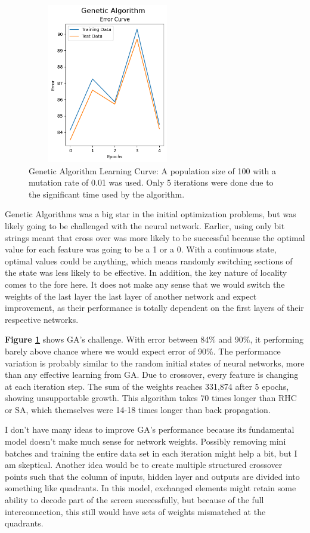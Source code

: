 \documentclass[letterpaper]{article} %
\begin{document}
\begin{figure}[!htb]
\centering
\includegraphics[width=2.75in, height=2.75in]{figures/Genetic_Algorithm__algorithm_ga_epochs_5_max_iters_3_max_attempts_3_seed_1_.png}
\caption{Genetic Algorithm Learning Curve:  A population size of 100 with a mutation rate of 0.01 was used.  Only 5 iterations were done due to the significant time used by the algorithm.  }
\label{fig:nn_ga}
\end{figure}

Genetic Algorithms was a big star in the initial optimization problems, but was likely going to be challenged with the neural network.  Earlier, using only bit strings meant that cross over was more likely to be successful because the optimal value for each feature was going to be a 1 or a 0.  With a continuous state, optimal values could be anything, which means randomly switching sections of the state was less likely to be effective.  In addition, the key nature of locality comes to the fore here.  It does not make any sense that we would switch the weights of the last layer the last layer of another network and expect improvement, as their performance is totally dependent on the first layers of their respective networks. 

 \textbf{Figure \ref{fig:nn_ga}} shows GA's challenge.   With error between 84\% and 90\%, it performing barely above chance where we would expect error of 90\%.  The performance variation is probably similar to the random initial states of neural networks, more than any effective learning from GA. Due to crossover, every feature is changing at each iteration step.   The sum of the weights reaches 331,874 after 5 epochs, showing unsupportable growth.  This algorithm takes 70 times longer than RHC or SA, which themselves were 14-18 times longer than back propagation.
 
I don't have many ideas to improve GA's performance because its fundamental model doesn't make much sense for network weights.  Possibly removing mini batches and training the entire data set in each iteration might help a bit, but I am skeptical.  Another idea would be to create multiple structured crossover points such that the column of inputs, hidden layer and outputs are divided into something like quadrants.  In this model, exchanged elements might retain some ability to decode part of the screen successfully, but because of the full interconnection, this still would have sets of weights mismatched at the quadrants.
\end{document}
